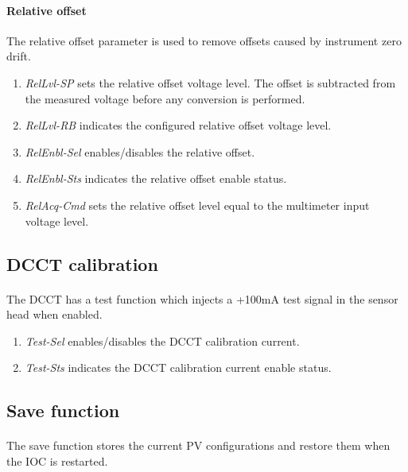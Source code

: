 \documentclass[openany]{article}
\begin{document}
		\paragraph{Relative offset}\label{relative-offset} The relative offset parameter is used to remove offsets caused by instrument zero drift.

			\begin{enumerate}
				\item \emph{RelLvl-SP} sets the relative offset voltage level. The offset is subtracted from the measured voltage before any conversion is performed.
				\item \emph{RelLvl-RB} indicates the configured relative offset voltage level.
				\item \emph{RelEnbl-Sel} enables/disables the relative offset.
				\item \emph{RelEnbl-Sts} indicates the relative offset enable status.
				\item \emph{RelAcq-Cmd} sets the relative offset level equal to the multimeter input voltage level.
			\end{enumerate}

	\subsection{DCCT calibration}

		\paragraph{} The DCCT has a test function which injects a +100mA test signal in the sensor head when enabled.

			\begin{enumerate}
				\item \emph{Test-Sel} enables/disables the DCCT calibration current.
				\item \emph{Test-Sts} indicates the DCCT calibration current enable status.
			\end{enumerate}

	\subsection{Save function}

		\paragraph{} The save function stores the current PV configurations and restore them when the IOC is restarted.
\end{document}
